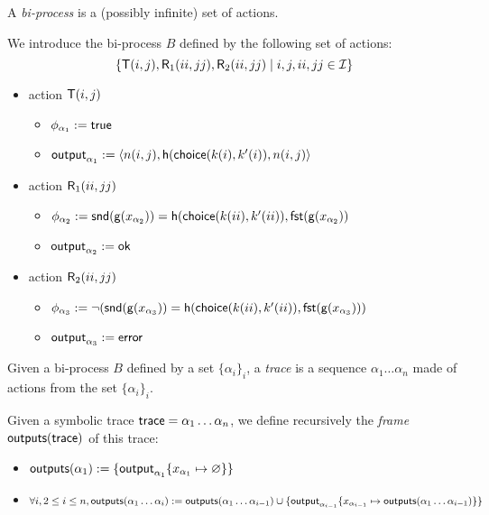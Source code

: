 \begin{definition}
  A \emph{bi-process} is a (possibly infinite) set of actions.
\end{definition}

\begin{example}
  \label{ex:basic-hash-bi-process}
  We introduce the bi-process $B$ defined by the following set of actions: $$\{\textsf{T}(i,j),\textsf{R}_1(ii,jj),\textsf{R}_2(ii,jj) \mid i,j,ii,jj \in \mathcal{I}\}$$
  \begin{itemize}
    \item action $\textsf{T}(i,j)$
      \begin{itemize}
        \item $\phi_{\alpha_1} := \textsf{true}$
        \item $\textsf{output}_{\alpha_1} := \langle n(i,j), \mathsf{h}(\mathsf{choice}(k(i),k'(i)),n(i,j) \rangle$
      \end{itemize}
    \item action $\textsf{R}_1(ii,jj)$
      \begin{itemize}
        \item $\phi_{\alpha_2} := \mathsf{snd}(\mathsf{g}(x_{\alpha_2})) = \mathsf{h}(\mathsf{choice}(k(ii),k'(ii)),\mathsf{fst}(\mathsf{g}(x_{\alpha_2}))$
        \item $\textsf{output}_{\alpha_2} := \mathsf{ok}$
      \end{itemize}
    \item action $\textsf{R}_2(ii,jj)$
      \begin{itemize}
        \item $\phi_{\alpha_3} := \neg (\mathsf{snd}(\mathsf{g}(x_{\alpha_3})) = \mathsf{h}(\mathsf{choice}(k(ii),k'(ii)),\mathsf{fst}(\mathsf{g}(x_{\alpha_3})))$
        \item $\textsf{output}_{\alpha_3} := \mathsf{error}$
      \end{itemize}
  \end{itemize}
\end{example}

\begin{definition}
  Given a bi-process $B$ defined by a set $\{\alpha_i\}_i$, a \emph{trace} is a sequence $\alpha_1 \dots \alpha_n$ made of actions from the set $\{\alpha_i\}_i$.
\end{definition}

\begin{definition}
  Given a symbolic trace $\textsf{trace} = \alpha_1 \dots \alpha_n$, we define recursively the \emph{frame} $\textsf{outputs}(\textsf{trace})$ of this trace:
  \begin{itemize}
    \item $\textsf{outputs}(\alpha_1) := \{ \textsf{output}_{\alpha_1}\{x_{\alpha_1} \mapsto \varnothing\} \}$
    \item $\forall i, 2 \leq i \leq n, \textsf{outputs}(\alpha_1 \dots \alpha_i) := \textsf{outputs}(\alpha_1 \dots \alpha_{i-1}) \cup \{ \textsf{output}_{\alpha_{i-1}}\{x_{\alpha_{i-1}} \mapsto \textsf{outputs}(\alpha_1 \dots \alpha_{i-1})\} \}$
  \end{itemize}
\end{definition}


